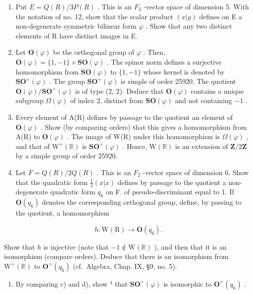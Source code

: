 \begin{enumerate}
\def\labelenumi{\alph{enumi})}
\item
  Put \(E = Q(R)/3P(R)\) . This is an \(F_{3}\) -vector space of dimension 5. With the notation of no. 12, show that the scalar product \((x|y)\) defines on E a non-degenerate symmetric bilinear form \(\varphi\) . Show that any two distinct elements of R have distinct images in E.
\item
  Let \(\mathbf{O}(\varphi)\) be the orthogonal group of \(\varphi\) . Then, \(\mathbf{O}(\varphi) = \{1, -1\} \times \mathbf{SO}(\varphi)\) . The spinor norm defines a surjective homomorphism from \(\mathbf{SO}(\varphi)\) to \(\{1, -1\}\) whose kernel is denoted by \(\mathbf{SO}^{+}(\varphi)\) . The group \(\mathbf{SO}^{+}(\varphi)\) is simple of order 25920. The quotient \(\mathbf{O}(\varphi)/\mathbf{SO}^{+}(\varphi)\) is of type (2, 2). Deduce that \(\mathbf{O}(\varphi)\) contains a unique subgroup \(\Omega(\varphi)\) of index 2, distinct from \(\mathbf{SO}(\varphi)\) and not containing \(-1\) .
\item
  Every element of A(R) defines by passage to the quotient an element of \(\mathbf{O}(\varphi)\) . Show (by comparing orders) that this gives a homomorphism from A(R) to \(\mathbf{O}(\varphi)\) . The image of W(R) under this homomorphism is \(\Omega(\varphi)\) , and that of \(\mathrm{W}^{+}(\mathbb{R})\) is \(\mathbf{SO}^{+}(\varphi)\) . Hence, \(\mathrm{W}(\mathbb{R})\) is an extension of \(\mathbf{Z}/2\mathbf{Z}\) by a simple group of order 25920.
\item
  Let \(F = Q(R)/2Q(R)\) . This is an \(F_{2}\) -vector space of dimension 6. Show that the quadratic form \(\frac{1}{2}(x|x)\) defines by passage to the quotient a non-degenerate quadratic form \(q_{6}\) on F. of pseudo-discriminant equal to 1. If \(\mathbf{O}(q_{6})\) denotes the corresponding orthogonal group, define, by passing to the quotient, a homomorphism
\end{enumerate}

\[
h: \mathrm{W} (\mathrm{R}) \rightarrow \mathbf {O} (q _ {6}).
\]

Show that \(h\) is injective (note that \(-1 \notin \mathrm{W}(\mathbb{R})\) ), and then that it is an isomorphism (compare orders). Deduce that there is an isomorphism from \(\mathrm{W}^{+}(\mathbb{R})\) to \(\mathbf{O}^{+}(q_{6})\) (cf.~Algebra, Chap. IX, §9, no. 5).

\begin{enumerate}
\def\labelenumi{\alph{enumi})}
\setcounter{enumi}{2}
\tightlist
\item
  By comparing c) and d), show \(^{4}\) that \(\mathbf{SO}^{+}(\varphi)\) is isomorphic to \(\mathbf{O}^{+}(q_{6})\) .
\end{enumerate}


